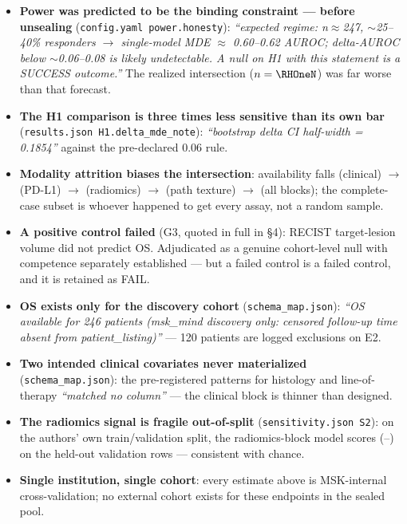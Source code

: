 \documentclass[11pt,a4paper]{article}
\begin{document}
\begin{itemize}[leftmargin=1.2em,itemsep=2pt]
\item \textbf{Power was predicted to be the binding constraint --- before unsealing}
(\texttt{config.yaml power.honesty}): \emph{``expected regime: n$\approx$247, $\sim$25--40\%
responders $\rightarrow$ single-model MDE $\approx$ 0.60--0.62 AUROC; delta-AUROC below
$\sim$0.06--0.08 is likely undetectable. A null on H1 with this statement is a SUCCESS
outcome.''} The realized intersection ($n=\RHOneN$) was far worse than that forecast.
\item \textbf{The H1 comparison is three times less sensitive than its own bar}
(\texttt{results.json H1.delta\_mde\_note}): \emph{``bootstrap delta CI half-width =
0.1854''} against the pre-declared 0.06 rule.
\item \textbf{Modality attrition biases the intersection}: availability falls
\RAvClin{} (clinical) $\rightarrow$ \RAvPdl{} (PD-L1) $\rightarrow$ \RAvRad{} (radiomics)
$\rightarrow$ \RAvPathg{} (path texture) $\rightarrow$ \RHOneN{} (all blocks); the
complete-case subset is whoever happened to get every assay, not a random sample.
\item \textbf{A positive control failed} (G3, quoted in full in \S4): RECIST target-lesion
volume did not predict OS. Adjudicated as a genuine cohort-level null with competence
separately established --- but a failed control is a failed control, and it is retained as
FAIL.
\item \textbf{OS exists only for the discovery cohort}
(\texttt{schema\_map.json}): \emph{``OS available for 246 patients (msk\_mind discovery only:
censored follow-up time absent from patient\_listing)''} --- 120 patients are logged
exclusions on E2.
\item \textbf{Two intended clinical covariates never materialized}
(\texttt{schema\_map.json}): the pre-registered patterns for histology and line-of-therapy
\emph{``matched no column''} --- the clinical block is thinner than designed.
\item \textbf{The radiomics signal is fragile out-of-split}
(\texttt{sensitivity.json S2}): on the authors' own train/validation split, the
radiomics-block model scores \RAuthorSplitRad{} (\RAuthorSplitRadLo--\RAuthorSplitRadHi) on
the held-out validation rows --- consistent with chance.
\item \textbf{Single institution, single cohort}: every estimate above is MSK-internal
cross-validation; no external cohort exists for these endpoints in the sealed pool.

\end{itemize}
\end{document}
